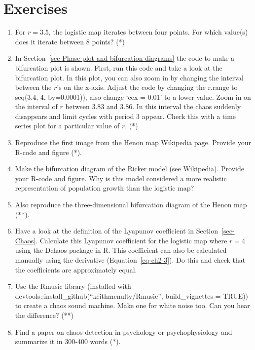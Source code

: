 \documentclass[
  a4paper,
  DIV=11,
  numbers=noendperiod]{scrreprt}
\begin{document}
\hypertarget{sec-Exercises}{%
\section{Exercises}\label{sec-Exercises}}

\begin{enumerate}
\def\labelenumi{\arabic{enumi})}
\item
  For \(r=3.5\), the logistic map iterates between four points. For
  which value(s) does it iterate between 8 points? (*)
\item
  In Section~\ref{sec-Phase-plot-and-bifurcation-diagrams} the code to
  make a bifurcation plot is shown. First, run this code and take a look
  at the bifurcation plot. In this plot, you can also zoom in by
  changing the interval between the \(r\)'s on the x-axis. Adjust the
  code by changing the r.range to seq(3.4, 4, by=0.0001)), also change
  `cex = 0.01' to a lower value. Zoom in on the interval of \(r\)
  between 3.83 and 3.86. In this interval the chaos suddenly disappears
  and limit cycles with period 3 appear. Check this with a time series
  plot for a particular value of \(r\). (*)
\item
  Reproduce the first image from the Henon map Wikipedia page. Provide
  your R-code and figure (*).
\item
  Make the bifurcation diagram of the Ricker model (see Wikipedia).
  Provide your R-code and figure. Why is this model considered a more
  realistic representation of population growth than the logistic map?
\item
  Also reproduce the three-dimensional bifurcation diagram of the Henon
  map (**).
\item
  Have a look at the definition of the Lyapunov coefficient in
  Section~\ref{sec-Chaos}. Calculate this Lyapunov coefficient for the
  logistic map where \(r = 4\) using the Dchaos package in R. This
  coefficient can also be calculated manually using the derivative
  (Equation~\ref{eq-ch2-3}). Do this and check that the coefficients are
  approximately equal.
\item
  Use the Rmusic library (installed with
  devtools::install\_github(``keithmcnulty/Rmusic'', build\_vignettes =
  TRUE)) to create a chaos sound machine. Make one for white noise too.
  Can you hear the difference? (**)
\item
  Find a paper on chaos detection in psychology or psychophysiology and
  summarize it in 300-400 words (*).
\end{enumerate}
\end{document}
